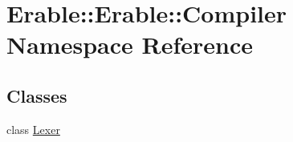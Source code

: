 \hypertarget{namespace_erable_1_1_erable_1_1_compiler}{}\section{Erable\+::Erable\+::Compiler Namespace Reference}
\label{namespace_erable_1_1_erable_1_1_compiler}
\subsection*{Classes}
\begin{DoxyCompactItemize}
\item 
class \mbox{\hyperlink{class_erable_1_1_erable_1_1_compiler_1_1_lexer}{Lexer}}
\end{DoxyCompactItemize}
